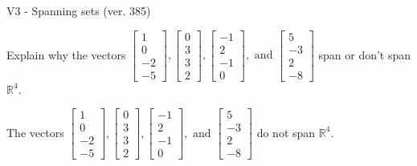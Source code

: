 \begin{exercise}
  \begin{exerciseTitle}V3 - Spanning sets (ver. 385)\end{exerciseTitle}
  \begin{exerciseStatement}
    Explain why the vectors \(\left[\begin{array}{r}
1 \\
0 \\
-2 \\
-5
\end{array}\right] , \left[\begin{array}{r}
0 \\
3 \\
3 \\
2
\end{array}\right] , \left[\begin{array}{r}
-1 \\
2 \\
-1 \\
0
\end{array}\right] , \text{ and } \left[\begin{array}{r}
5 \\
-3 \\
2 \\
-8
\end{array}\right]\) span or don't span \(\mathbb{R}^4\). 
	


  \end{exerciseStatement}
  \begin{exerciseAnswer}
   The vectors \(\left[\begin{array}{r}
1 \\
0 \\
-2 \\
-5
\end{array}\right] , \left[\begin{array}{r}
0 \\
3 \\
3 \\
2
\end{array}\right] , \left[\begin{array}{r}
-1 \\
2 \\
-1 \\
0
\end{array}\right] , \text{ and } \left[\begin{array}{r}
5 \\
-3 \\
2 \\
-8
\end{array}\right]\) 
  	 do not  
	span \(\mathbb{R}^4\).
  


  \end{exerciseAnswer}
\end{exercise}